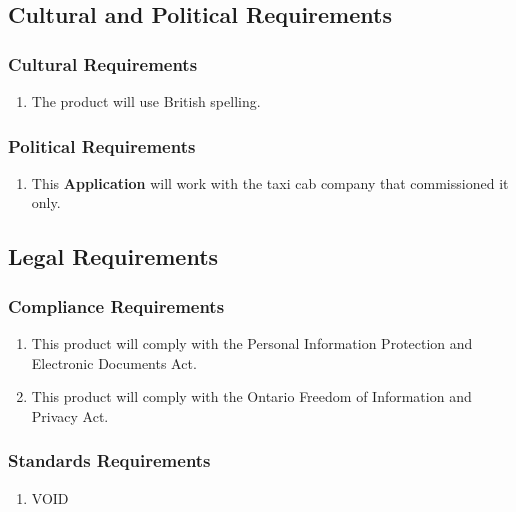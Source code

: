 \documentclass[english]{article}
\begin{document}

\subsection{Cultural and Political Requirements}
\label{sub:cultural_and_political_requirements}

\subsubsection{Cultural Requirements}
\label{ssub:cultural_requirements}
\begin{enumerate}[{CCR}1. ]
	\item The product will use British spelling.
\end{enumerate}

\subsubsection{Political Requirements}
\label{ssub:political_requirements}
\begin{enumerate}[{CPR}1. ]
	\item This \textbf{Application} will work with the taxi cab company that commissioned it only.
\end{enumerate}


\subsection{Legal Requirements}
\label{sub:legal_requirements}

\subsubsection{Compliance Requirements}
\label{ssub:compliance_requirements}
\begin{enumerate}[{LCR}1. ]
	\item This product will comply with the Personal Information Protection and Electronic Documents Act.
	\item This product will comply with the Ontario Freedom of Information and Privacy Act.
\end{enumerate}

\subsubsection{Standards Requirements}
\label{ssub:standards_requirements}
\begin{enumerate}[{LSR}1. ]
	\item VOID
\end{enumerate}
\end{document}
